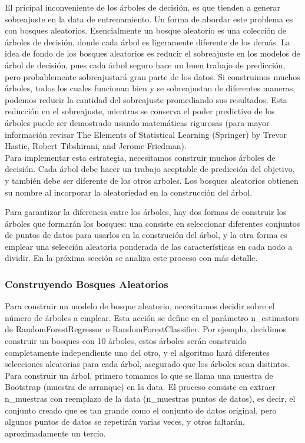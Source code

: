 {El pricipal inconveniente  de los árboles de decisión, es que tienden a generar sobreajuste en la  data de entrenamiento. Un forma de abordar este problema es con  bosques aleatorios. Esencialmente un bosque aleatorio es  una colección de árboles de decisión, donde cada árbol es ligeramente diferente de los demás. La idea de fondo de los bosques aleatorios es reducir el sobreajuste en los modelos de árbol de decisión, pues cada árbol seguro hace un buen trabajo de predicción, pero probablemente  sobreajustará  gran parte de los datos. Si construimos muchos  árboles, todos los cuales funcionan bien y se sobreajustan de diferentes maneras, podemos reducir la cantidad  del sobreajuste promediando sus resultados. Esta reducción en el sobreajuste, mientras se conserva  el poder predictivo de los árboles puede ser  demostrado usando matemáticas rigurosas (para mayor información revisar The Elements of Statistical Learning (Springer) by Trevor Hastie, Robert Tibshirani, and Jerome Friedman). \\

Para implementar esta estrategia, necesitamos construir muchos árboles de decisión.  Cada árbol debe hacer un trabajo aceptable de predicción del objetivo, y también debe ser diferente de los otros arboles. Los bosques aleatorios obtienen su nombre al incorporar la aleatoriedad en la construcción del árbol.
 
Para garantizar la diferencia entre los árboles, hay dos formas de construir los árboles que formarán los bosques: una consiste en  seleccionar diferentes conjuntos de puntos de datos para usarlos en la construción del árbol, y la otra forma es emplear una  selección aleatoria ponderada de  las características en cada nodo a dividir.  En la próxima sección se analiza  este proceso con más detalle.\\


\subsubsection{Construyendo Bosques  Aleatorios}


Para construir un modelo de bosque aleatorio, necesitamos decidir sobre el número de árboles a emplear. Esta acción se define en el parámetro {\ttfamily n\_estimators} de {\ttfamily RandomForestRegressor} o {\ttfamily RandomForestClassifier}.   Por ejemplo, decidimos  construir un bosques con 10 árboles, estos árboles serán construido completamente independiente  uno del otro, y el algoritmo hará  diferentes selecciones aleatorias  para cada árbol, asegurado que los árboles sean distintos.   
Para construir un árbol, primero tomamos lo que se llama una muestra de Bootstrap (muestra de arranque) en la data. El proceso consiste en extraer n\_muestras con reemplazo de la data (n\_muestras puntos de datos), es decir,  el conjunto creado que es tan grande como el conjunto de datos original, pero algunos puntos de datos se repetirán varias veces, y otros faltarán, aproximadamente un tercio. \\

}

